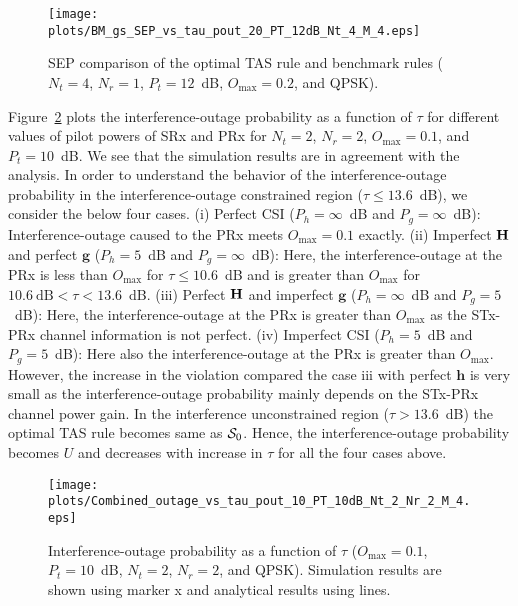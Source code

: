 \documentclass[12pt,draftcls,peerreview,onecolumn]{IEEEtran}
\newcommand{\mtx}[1]{{\bf #1}} %
\newcommand{\Nt}{{N_t}}
\newcommand{\Nr}{{N_r}}
\newcommand{\Pt}{{P_t}}
\newcommand{\such}{h}
\newcommand{\puch}{g}
\newcommand{\h}{\mathbf{\such}}
\newcommand{\g}{\mathbf{\puch}}
\newcommand{\outmax}{O_{\text{max}}}
\newcommand{\itau}{\tau}
\newcommand{\un}{U}
\newcommand{\Hmx}{\mtx{H}}
\newcommand{\caluncons}{{\cal S_{\text{0}}}}
\newcommand{\gpilotpower}{P_g}
\newcommand{\hpilotpower}{P_h}
\begin{document}
\begin{figure}
	\centering \texttt{[image: plots/BM\_gs\_SEP\_vs\_tau\_pout\_20\_PT\_12dB\_Nt\_4\_M\_4.eps]}
	\caption{SEP comparison of the optimal TAS rule and benchmark rules ($\Nt = 4$, $\Nr=1$, $\Pt = 12$~dB, $\outmax = 0.2$, and QPSK).}
	\label{fig:BM_SEP_vs_tau}
\end{figure}


Figure~\ref{fig:out_vs_tau_imp_CSI} plots the interference-outage probability as a function of $\itau$ for different values of pilot powers of SRx and PRx for $\Nt=2$, $\Nr=2$, $\outmax = 0.1$, and $\Pt=10$~dB. We see that the simulation results are in agreement with the analysis. In order to understand the behavior of the interference-outage probability in the interference-outage constrained region ($\tau\leq 13.6$~dB), we consider the below four cases. (i) Perfect CSI ($\hpilotpower=\infty$~dB and $\gpilotpower=\infty$~dB): Interference-outage caused to the PRx meets $\outmax=0.1$ exactly. (ii) Imperfect $\Hmx$ and perfect $\g$ ($\hpilotpower=5$~dB and $\gpilotpower=\infty$~dB): Here, the interference-outage at the PRx is less than $\outmax$ for $\itau\leq 10.6$~dB and is greater than $\outmax$ for $10.6~\text{dB}<\itau<13.6$~dB. (iii) Perfect $\Hmx$ and imperfect $\g$ ($\hpilotpower=\infty$~dB and $\gpilotpower=5$~dB): Here, the interference-outage at the PRx is greater than $\outmax$ as the STx-PRx channel information is not perfect. (iv) Imperfect CSI ($\hpilotpower=5$~dB and $\gpilotpower=5$~dB): Here also the interference-outage at the PRx is greater than $\outmax$. However, the increase in the violation compared the case iii with perfect $\h$ is very small as the interference-outage probability mainly depends on the STx-PRx channel power gain. In the interference unconstrained region ($\itau>13.6$~dB) the optimal TAS rule becomes same as $\caluncons$. Hence, the interference-outage probability becomes $\un$ and decreases with increase in $\itau$ for all the four cases above.

\begin{figure}
	\centering \texttt{[image: plots/Combined\_outage\_vs\_tau\_pout\_10\_PT\_10dB\_Nt\_2\_Nr\_2\_M\_4.eps]}
	\caption{Interference-outage probability as a function of $\itau$ ($\outmax=0.1$, $\Pt = 10$~dB, $\Nt = 2$, $\Nr = 2$, and QPSK). Simulation results are shown using marker x and analytical results using lines.}
	\label{fig:out_vs_tau_imp_CSI}
\end{figure}
\end{document}
